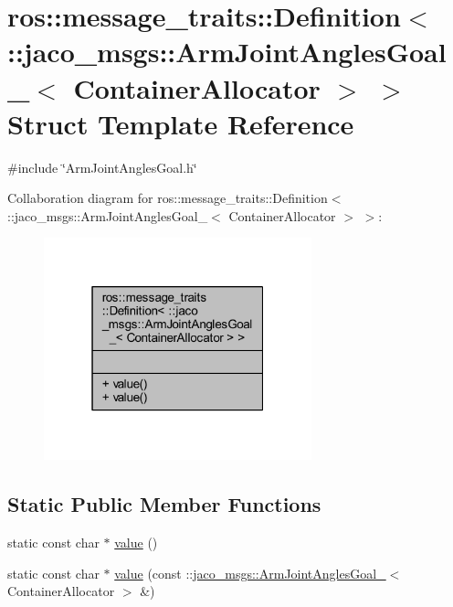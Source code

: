 \hypertarget{structros_1_1message__traits_1_1Definition_3_01_1_1jaco__msgs_1_1ArmJointAnglesGoal___3_01ContainerAllocator_01_4_01_4}{}\section{ros\+:\+:message\+\_\+traits\+:\+:Definition$<$ \+:\+:jaco\+\_\+msgs\+:\+:Arm\+Joint\+Angles\+Goal\+\_\+$<$ Container\+Allocator $>$ $>$ Struct Template Reference}
\label{structros_1_1message__traits_1_1Definition_3_01_1_1jaco__msgs_1_1ArmJointAnglesGoal___3_01ContainerAllocator_01_4_01_4}


{\ttfamily \#include \char`\"{}Arm\+Joint\+Angles\+Goal.\+h\char`\"{}}



Collaboration diagram for ros\+:\+:message\+\_\+traits\+:\+:Definition$<$ \+:\+:jaco\+\_\+msgs\+:\+:Arm\+Joint\+Angles\+Goal\+\_\+$<$ Container\+Allocator $>$ $>$\+:
\nopagebreak
\begin{figure}[H]
\begin{center}
\leavevmode
\includegraphics[width=220pt]{d8/d0e/structros_1_1message__traits_1_1Definition_3_01_1_1jaco__msgs_1_1ArmJointAnglesGoal___3_01Contai405f5965310f72754c9f471df1f02f3d}
\end{center}
\end{figure}
\subsection*{Static Public Member Functions}
\begin{DoxyCompactItemize}
\item 
static const char $\ast$ \hyperlink{structros_1_1message__traits_1_1Definition_3_01_1_1jaco__msgs_1_1ArmJointAnglesGoal___3_01ContainerAllocator_01_4_01_4_ad5720b4ad40070f8f6b848a5d0a5f1f2}{value} ()
\item 
static const char $\ast$ \hyperlink{structros_1_1message__traits_1_1Definition_3_01_1_1jaco__msgs_1_1ArmJointAnglesGoal___3_01ContainerAllocator_01_4_01_4_a2c221e52232132aabbf5ec5e933f68f1}{value} (const \+::\hyperlink{structjaco__msgs_1_1ArmJointAnglesGoal__}{jaco\+\_\+msgs\+::\+Arm\+Joint\+Angles\+Goal\+\_\+}$<$ Container\+Allocator $>$ \&)
\end{DoxyCompactItemize}


